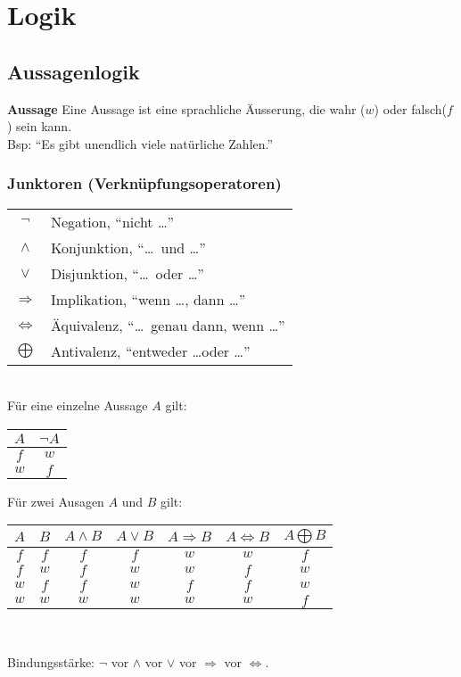 \section{Logik}
\subsection{Aussagenlogik}
\textbf{Aussage} Eine Aussage ist eine sprachliche Äusserung, 
die wahr ($w$) oder falsch($f$) sein kann.\\
Bsp: \enquote{Es gibt unendlich viele natürliche Zahlen.}

\subsubsection{Junktoren (Verknüpfungsoperatoren)}
\begin{tabular}{cl}
	$\neg$				& Negation, \enquote{nicht \dots}\\
	$\wedge$ 			& Konjunktion, \enquote{\dots\ und \dots}\\
	$\vee$ 				& Disjunktion, \enquote{\dots\ oder \dots}\\
	$\Rightarrow$ 		& Implikation, \enquote{wenn \dots, dann \dots}\\
	$\Leftrightarrow$	& Äquivalenz, \enquote{\dots\ genau dann, wenn \dots} \\
	$\bigoplus$			& Antivalenz, \enquote{entweder \dots oder  \dots}\\
\end{tabular}\\

Für eine einzelne Aussage $A$ gilt:\\
\begin{center}
\begin{tabular}{c||c}
	$A$ & $\neg A$ \\\hline
	$f$ & $w$ \\
	$w$ & $f$ \\
\end{tabular}
\end{center}

Für zwei Ausagen $A$ und $B$ gilt:
\begin{center}
\begin{tabular}{c|c||c|c|c|c|c}
	$A$ & $B$ 	& $A \wedge B$ 	& $A \vee B$ 	& $A \Rightarrow B$ 	& $A \Leftrightarrow B$ 	& $A \bigoplus B$ \\\hline
	$f$ & $f$ 	& $f$				& $f$			& $w$				& $w$					 	& $f$\\
	$f$ & $w$ 	& $f$				& $w$			& $w$				& $f$					 	& $w$\\	
	$w$ & $f$ 	& $f$				& $w$			& $f$				& $f$						& $w$\\
	$w$ & $w$ 	& $w$				& $w$			& $w$				& $w$						& $f$\\
\end{tabular}\\
\end{center}
Bindungsstärke: $\neg$ vor $\wedge$ vor $\vee$ vor $\Rightarrow$ vor $\Leftrightarrow$.\\

